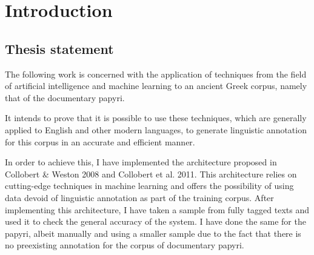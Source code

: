 \chapter{Introduction} 
\label{chp:introduction}


\section{Thesis statement}

The following work is concerned with the application of techniques
from the field of artificial intelligence and machine learning to an
ancient Greek corpus, namely that of the documentary papyri.

It intends to prove that it is possible to use these techniques, which
are generally applied to English and other modern languages, to
generate linguistic annotation for this corpus in an accurate and
efficient manner.

In order to achieve this, I have implemented the architecture proposed
in Collobert \& Weston 2008 and Collobert et al. 2011. This
architecture relies on cutting-edge techniques in machine learning and
offers the possibility of using data devoid of linguistic annotation
as part of the training corpus. After implementing this architecture,
I have taken a sample from fully tagged texts and used it to check the
general accuracy of the system. I have done the same for the papyri,
albeit manually and using a smaller sample due to the fact that there
is no preexisting annotation for the corpus of documentary papyri.


